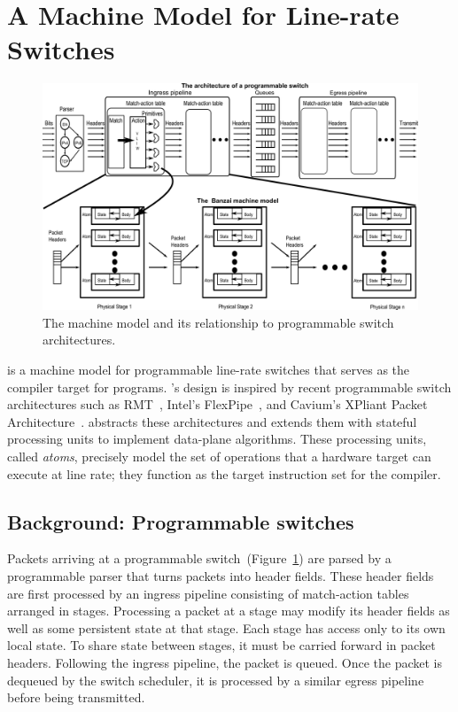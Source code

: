 \section{A Machine Model for Line-rate Switches}
\label{s:absmachine}

\begin{figure}[!t]
  \includegraphics[width=\textwidth]{banzai.pdf}
  \caption{The \absmachine machine model and its relationship to
  programmable switch architectures.}
  \label{fig:switch}
\end{figure}

\absmachine is a machine model for programmable line-rate switches
that serves as the compiler target for \pktlanguage programs.
\absmachine's design is inspired by recent programmable switch
architectures such as RMT~\cite{rmt}, Intel's
FlexPipe~\cite{flexpipe}, and Cavium's XPliant Packet
Architecture~\cite{xpliant}. \absmachine abstracts these architectures
and extends them with stateful processing units to implement
data-plane algorithms. These processing units, called {\em atoms},
precisely model the set of operations that a hardware target can
execute at line rate; they function as the target instruction set for
the \pktlanguage compiler.

\subsection{Background: Programmable switches}
Packets arriving at a programmable switch~(Figure~\ref{fig:switch}) are parsed
by a programmable parser that turns packets into header fields. These header
fields are first processed by an ingress pipeline consisting of match-action
tables arranged in stages. Processing a packet at a stage may modify its header
fields as well as some persistent state at that stage. Each stage has access
only to its own local state. To share state between stages, it must be carried
forward in packet headers. Following the ingress pipeline, the packet is
queued. Once the packet is dequeued by the switch scheduler, it is processed by
a similar egress pipeline before being transmitted.

